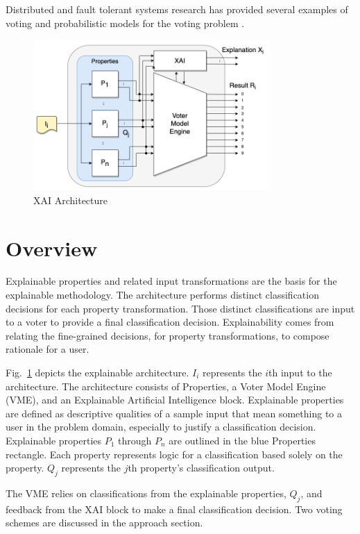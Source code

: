 \documentclass[conference]{IEEEtran}
\begin{document}
Distributed and fault tolerant systems research has provided several examples of voting \cite{avizienis} and probabilistic models for the voting problem \cite{blough}.

 \begin{figure}[htbp]
\centerline{\includegraphics[width=90mm]{./images/voting_prop_nn_2.png}}
\caption{XAI Architecture}
\label{voting}
\end{figure}

\section{Overview}


Explainable properties and related input transformations are the basis for the explainable methodology.  The architecture performs distinct classification decisions for each property transformation.  Those distinct classifications are input to a voter to provide a final classification decision.  Explainability comes from relating the fine-grained decisions, for property transformations, to compose rationale for a user.

Fig.~\ref{voting} depicts the explainable architecture.  $I_i$ represents the $i$th input to the architecture.  The architecture consists of Properties, a Voter Model Engine (VME),  and an Explainable Artificial Intelligence block.   Explainable properties are defined as descriptive qualities of a sample input that mean something to a user in the problem domain, especially to justify a classification decision.   Explainable properties $P_1$ through $P_n$ are outlined in the blue Properties rectangle.  Each property represents logic for a classification based solely on the property.   $Q_j$ represents the $j$th property's classification output.

The VME relies on classifications from the explainable properties, $Q_j$, and feedback from the XAI block to make a final classification decision.   Two voting schemes are discussed in the approach section.
\end{document}
